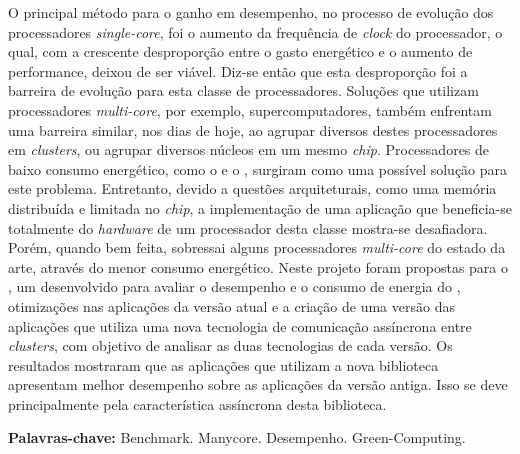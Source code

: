 \begin{resumo}[Resumo]
  O principal método para o ganho em desempenho, no processo de evolução dos processadores \textit{single-core}, foi o aumento da frequência de \textit{clock} do processador, o qual, com a crescente desproporção entre o gasto energético e o aumento de performance, deixou de ser viável. Diz-se então que esta desproporção foi a barreira de evolução para esta classe de processadores. Soluções que utilizam processadores \textit{multi-core}, por exemplo, supercomputadores, também enfrentam uma barreira similar, nos dias de hoje, ao agrupar diversos destes processadores em \textit{clusters}, ou agrupar diversos núcleos em um mesmo \textit{chip}. Processadores \manycore de baixo consumo energético, como o \mppa e o \epiphany, surgiram como uma possível solução para este problema. Entretanto, devido a questões arquiteturais, como uma memória distribuída e limitada no \textit{chip}, a implementação de uma aplicação que beneficia-se totalmente do \textit{hardware} de um processador desta classe mostra-se desafiadora. Porém, quando bem feita, sobressai alguns processadores \textit{multi-core} do estado da arte, através do menor consumo energético. Neste projeto foram propostas para o \capb, um \bench desenvolvido para avaliar o desempenho e o consumo de energia do \mppa, otimizações nas aplicações da versão atual e a criação de uma versão das aplicações que utiliza uma nova tecnologia de comunicação assíncrona entre \textit{clusters}, com objetivo de analisar as duas tecnologias de cada versão. Os resultados mostraram que as aplicações que utilizam a nova biblioteca apresentam melhor desempenho sobre as aplicações da versão antiga. Isso se deve principalmente pela característica assíncrona desta biblioteca.



  \vspace{\baselineskip} 
  \textbf{Palavras-chave:} Benchmark. Manycore. Desempenho. Green-Computing.
\end{resumo}


